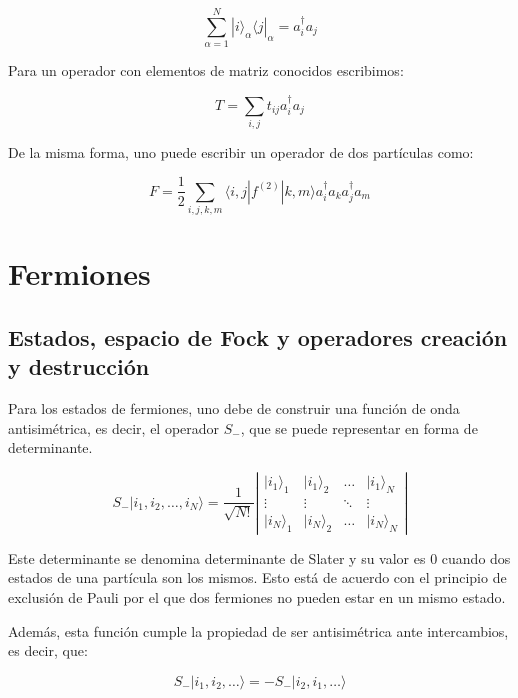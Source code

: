 \documentclass{article} %
\begin{document}
\begin{equation}
\sum_{\alpha = 1}^N |i\rangle_{\alpha} \langle j|_{\alpha} = a_i^{\dagger} a_j
\end{equation}

Para un operador con elementos de matriz conocidos escribimos:

\begin{equation}
T =  \sum_{i, j} t_{ij} a_i^{\dagger} a_j
\end{equation}

De la misma forma, uno puede escribir un operador de dos partículas como:

\begin{equation}
F = \frac{1}{2} \sum_{i, j, k, m} \langle i, j |f^{(2)} | k, m\rangle a_i^{\dagger} a_k a_j^{\dagger} a_m
\end{equation}

\section{Fermiones}

\subsection{Estados, espacio de Fock y operadores creación y destrucción}

Para los estados de fermiones, uno debe de construir una función de onda antisimétrica, es decir, el operador $S_-$, que se puede representar en forma de determinante.

\begin{equation}
S_- |i_1, i_2, \ldots, i_N\rangle = \frac{1}{\sqrt{N!}} \left| \begin{array}{cccc}
|i_1\rangle_1 & |i_1\rangle_2 & \ldots & |i_1\rangle_N \\
\vdots & \vdots & \ddots & \vdots \\
|i_N\rangle_1 & |i_N\rangle_2 & \ldots & |i_N\rangle_N
\end{array} \right|
\end{equation}

Este determinante se denomina determinante de Slater y su valor es 0 cuando dos estados de una partícula son los mismos. Esto está de acuerdo con el principio de exclusión de Pauli por el que dos fermiones no pueden estar en un mismo estado.

Además, esta función cumple la propiedad de ser antisimétrica ante intercambios, es decir, que:

$$
S_- |i_1, i_2, \ldots\rangle = -S_- |i_2, i_1, \ldots\rangle
$$
\end{document}
